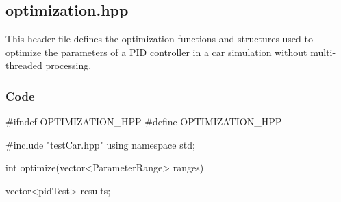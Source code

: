 \documentclass[a4paper,12pt]{article}
\begin{document}
\begin{lstlising}[language=C++]
\subsection{optimization.hpp}
This header file defines the optimization functions and structures used to optimize the parameters of a PID controller in a car simulation without multi-threaded processing.
\subsubsection{Code}
\begin{lstlising}[language=C++]
#ifndef OPTIMIZATION_HPP
#define OPTIMIZATION_HPP

#include "testCar.hpp"
using namespace std;

int optimize(vector<ParameterRange> ranges)
{
    vector<pidTest> results;

}
\end{lstlising}
\end{lstlising}
\end{document}
